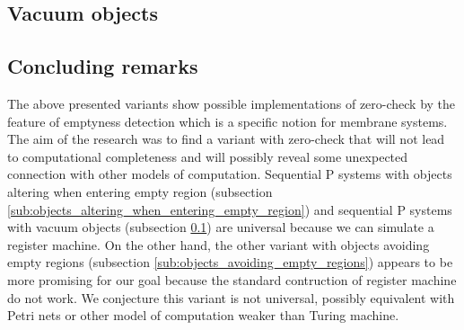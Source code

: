 
\subsection{Vacuum objects} %
\label{sub:vacuum_objects}


\subsection{Concluding remarks} %
\label{sub:concluding_remarks_of_emptyness_detection}

The above presented variants show possible implementations of zero-check by the feature of emptyness detection which is a specific notion for membrane systems. The aim of the research was to find a variant with zero-check that will not lead to computational completeness and will possibly reveal some unexpected connection with other models of computation. Sequential P systems with objects altering when entering empty region (subsection \ref{sub:objects_altering_when_entering_empty_region}) and sequential P systems with vacuum objects (subsection \ref{sub:vacuum_objects}) are universal because we can simulate a register machine. On the other hand, the other variant with objects avoiding empty regions (subsection \ref{sub:objects_avoiding_empty_regions}) appears to be more promising for our goal because the standard contruction of register machine do not work. We conjecture this variant is not universal, possibly equivalent with Petri nets or other model of computation weaker than Turing machine.

